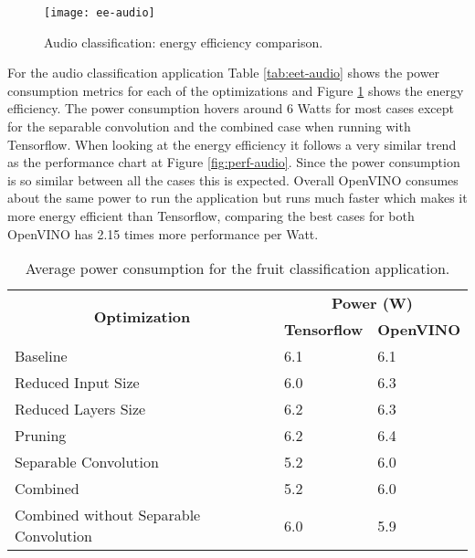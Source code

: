 \begin{figure}[thbp]
	\centering
	\texttt{[image: ee-audio]}
	\caption{Audio classification: energy efficiency comparison.}
	\label{fig:ee-audio}
\end{figure}

For the audio classification application Table \ref{tab:eet-audio} shows the power consumption metrics for each of the optimizations and Figure \ref{fig:ee-audio} shows the energy efficiency. The power consumption hovers around 6 Watts for most cases except for the separable convolution and the combined case when running with Tensorflow. When looking at the energy efficiency it follows a very similar trend as the performance chart at Figure \ref{fig:perf-audio}. Since the power consumption is so similar between all the cases this is expected. Overall OpenVINO consumes about the same power to run the application but runs much faster which makes it more energy efficient than Tensorflow, comparing the best cases for both OpenVINO has 2.15 times more performance per Watt.

\begin{table}[thbp]
\centering
\caption{Average power consumption for the fruit classification application.}
\label{tab:eet-fruit}
\begin{tabular}{|l|l|l|}
\hline
\multicolumn{1}{|c|}{\multirow{2}{*}{\textbf{Optimization}}} & \multicolumn{2}{c|}{\textbf{Power (W)}}                                           \\ \cline{2-3} 
\multicolumn{1}{|c|}{}                                       & \multicolumn{1}{c|}{\textbf{Tensorflow}} & \multicolumn{1}{c|}{\textbf{OpenVINO}} \\ \hline
Baseline                                                     & 6.1                 & 6.1               \\ \hline
Reduced Input Size                                           & 6.0                 & 6.3               \\ \hline
Reduced Layers Size                                          & 6.2                 & 6.3               \\ \hline
Pruning                                                      & 6.2                 & 6.4               \\ \hline
Separable Convolution                                        & 5.2                 & 6.0               \\ \hline
Combined                                                     & 5.2                 & 6.0               \\ \hline
Combined without Separable Convolution                       & 6.0                 & 5.9               \\ \hline
\end{tabular}
\end{table}

